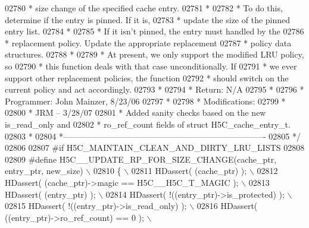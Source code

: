 \begin{DoxyCode}
02780 \textcolor{comment}{ *      size change of the specified cache entry.}
02781 \textcolor{comment}{ *}
02782 \textcolor{comment}{ *      To do this, determine if the entry is pinned.  If it is,}
02783 \textcolor{comment}{ *      update the size of the pinned entry list.}
02784 \textcolor{comment}{ *}
02785 \textcolor{comment}{ *      If it isn't pinned, the entry must handled by the}
02786 \textcolor{comment}{ *      replacement policy.  Update the appropriate replacement}
02787 \textcolor{comment}{ *      policy data structures.}
02788 \textcolor{comment}{ *}
02789 \textcolor{comment}{ *      At present, we only support the modified LRU policy, so}
02790 \textcolor{comment}{ *      this function deals with that case unconditionally.  If}
02791 \textcolor{comment}{ *      we ever support other replacement policies, the function}
02792 \textcolor{comment}{ *      should switch on the current policy and act accordingly.}
02793 \textcolor{comment}{ *}
02794 \textcolor{comment}{ * Return:      N/A}
02795 \textcolor{comment}{ *}
02796 \textcolor{comment}{ * Programmer:  John Mainzer, 8/23/06}
02797 \textcolor{comment}{ *}
02798 \textcolor{comment}{ * Modifications:}
02799 \textcolor{comment}{ *}
02800 \textcolor{comment}{ *      JRM -- 3/28/07}
02801 \textcolor{comment}{ *      Added sanity checks based on the new is\_read\_only and}
02802 \textcolor{comment}{ *      ro\_ref\_count fields of struct H5C\_cache\_entry\_t.}
02803 \textcolor{comment}{ *}
02804 \textcolor{comment}{ *-------------------------------------------------------------------------}
02805 \textcolor{comment}{ */}
02806 
02807 \textcolor{preprocessor}{#if H5C\_MAINTAIN\_CLEAN\_AND\_DIRTY\_LRU\_LISTS}
02808 
02809 \textcolor{preprocessor}{#define H5C\_\_UPDATE\_RP\_FOR\_SIZE\_CHANGE(cache\_ptr, entry\_ptr, new\_size)    \(\backslash\)}
02810 \textcolor{preprocessor}{\{                                                                         \(\backslash\)}
02811 \textcolor{preprocessor}{    HDassert( (cache\_ptr) );                                              \(\backslash\)}
02812 \textcolor{preprocessor}{    HDassert( (cache\_ptr)->magic == H5C\_\_H5C\_T\_MAGIC );                   \(\backslash\)}
02813 \textcolor{preprocessor}{    HDassert( (entry\_ptr) );                                              \(\backslash\)}
02814 \textcolor{preprocessor}{    HDassert( !((entry\_ptr)->is\_protected) );                             \(\backslash\)}
02815 \textcolor{preprocessor}{    HDassert( !((entry\_ptr)->is\_read\_only) );                             \(\backslash\)}
02816 \textcolor{preprocessor}{    HDassert( ((entry\_ptr)->ro\_ref\_count) == 0 );                         \(\backslash\)}

\end{DoxyCode}
